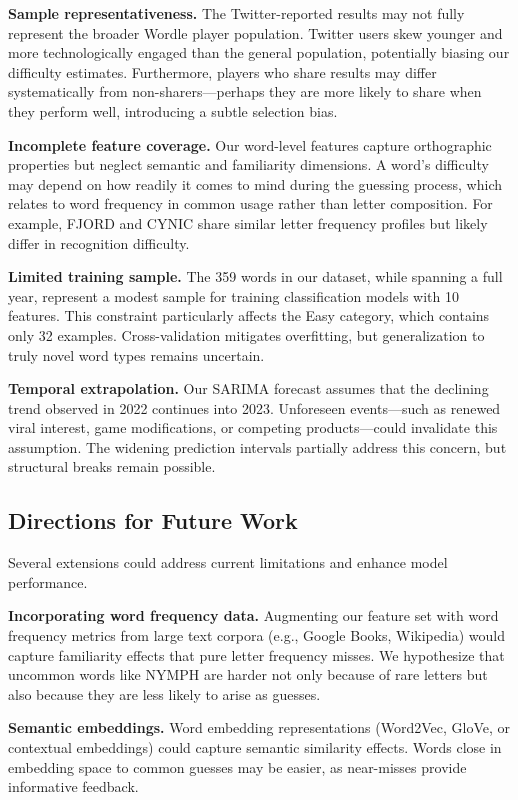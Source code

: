 \documentclass{mcmthesis}
\begin{document}
\textbf{Sample representativeness.} The Twitter-reported results may not fully represent the broader Wordle player population. Twitter users skew younger and more technologically engaged than the general population, potentially biasing our difficulty estimates. Furthermore, players who share results may differ systematically from non-sharers---perhaps they are more likely to share when they perform well, introducing a subtle selection bias.

\textbf{Incomplete feature coverage.} Our word-level features capture orthographic properties but neglect semantic and familiarity dimensions. A word's difficulty may depend on how readily it comes to mind during the guessing process, which relates to word frequency in common usage rather than letter composition. For example, FJORD and CYNIC share similar letter frequency profiles but likely differ in recognition difficulty.

\textbf{Limited training sample.} The 359 words in our dataset, while spanning a full year, represent a modest sample for training classification models with 10 features. This constraint particularly affects the Easy category, which contains only 32 examples. Cross-validation mitigates overfitting, but generalization to truly novel word types remains uncertain.

\textbf{Temporal extrapolation.} Our SARIMA forecast assumes that the declining trend observed in 2022 continues into 2023. Unforeseen events---such as renewed viral interest, game modifications, or competing products---could invalidate this assumption. The widening prediction intervals partially address this concern, but structural breaks remain possible.

\subsection{Directions for Future Work}

Several extensions could address current limitations and enhance model performance.

\textbf{Incorporating word frequency data.} Augmenting our feature set with word frequency metrics from large text corpora (e.g., Google Books, Wikipedia) would capture familiarity effects that pure letter frequency misses. We hypothesize that uncommon words like NYMPH are harder not only because of rare letters but also because they are less likely to arise as guesses.

\textbf{Semantic embeddings.} Word embedding representations (Word2Vec, GloVe, or contextual embeddings) could capture semantic similarity effects. Words close in embedding space to common guesses may be easier, as near-misses provide informative feedback.
\end{document}
